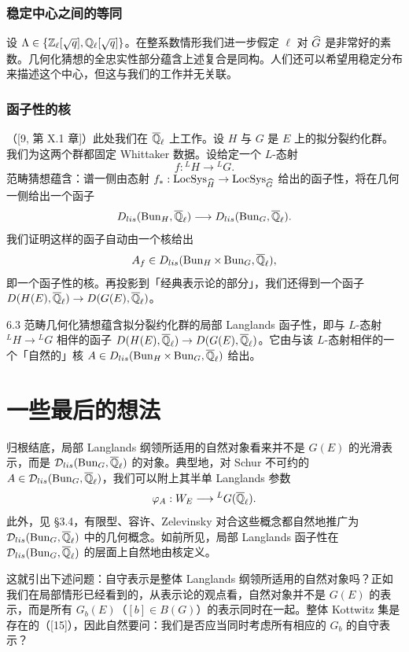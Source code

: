 \subsubsection{稳定中心之间的等同}
设 $\Lambda\in\{\mathbb{Z}_\ell[\sqrt q],\mathbb{Q}_\ell[\sqrt q]\}$。在整系数情形我们进一步假定 $\ell$ 对 $\widehat{G}$ 是非常好的素数。几何化猜想的全忠实性部分蕴含上述复合是同构。人们还可以希望用稳定分布来描述这个中心，但这与我们的工作并无关联。

\subsubsection{函子性的核}
（[9, 第 X.1 章]）此处我们在 $\overline{\mathbb{Q}}_\ell$ 上工作。设 $H$ 与 $G$ 是 $E$ 上的拟分裂约化群。我们为这两个群都固定 Whittaker 数据。设给定一个 $L$-态射
\[
f:{}^LH\longrightarrow{}^LG.
\]
范畴猜想蕴含：谱一侧由态射 $f_*:\operatorname{LocSys}_{\widehat{H}}\to\operatorname{LocSys}_{\widehat{G}}$ 给出的函子性，将在几何一侧给出一个函子
\[
D_{lis}(\operatorname{Bun}_H,\overline{\mathbb{Q}}_\ell)\longrightarrow D_{lis}(\operatorname{Bun}_G,\overline{\mathbb{Q}}_\ell).
\]
我们证明这样的函子自动由一个核给出
\[
A_f\in D_{lis}(\operatorname{Bun}_H\times\operatorname{Bun}_G,\overline{\mathbb{Q}}_\ell),
\]
即一个函子性的核。再投影到「经典表示论的部分」，我们还得到一个函子 $D(H(E),\overline{\mathbb{Q}}_\ell)\to D(G(E),\overline{\mathbb{Q}}_\ell)$。

\begin{thm}{6.3}\label{thm:a3-6-3}
范畴几何化猜想蕴含拟分裂约化群的局部 Langlands 函子性，即与 $L$-态射 ${}^LH\to{}^LG$ 相伴的函子 $D(H(E),\overline{\mathbb{Q}}_\ell)\to D(G(E),\overline{\mathbb{Q}}_\ell)$。它由与该 $L$-态射相伴的一个「自然的」核 $A\in D_{lis}(\operatorname{Bun}_H\times\operatorname{Bun}_G,\overline{\mathbb{Q}}_\ell)$ 给出。
\end{thm}

\section{一些最后的想法}
归根结底，局部 Langlands 纲领所适用的自然对象看来并不是 $G(E)$ 的光滑表示，而是 $\mathcal{D}_{lis}(\operatorname{Bun}_G,\overline{\mathbb{Q}}_\ell)$ 的对象。典型地，对 Schur 不可约的 $A\in\mathcal{D}_{lis}(\operatorname{Bun}_G,\overline{\mathbb{Q}}_\ell)$，我们可以附上其半单 Langlands 参数
\[
\varphi_A:W_E\longrightarrow{}^LG(\overline{\mathbb{Q}}_\ell).
\]
此外，见 §3.4，有限型、容许、Zelevinsky 对合这些概念都自然地推广为 $\mathcal{D}_{lis}(\operatorname{Bun}_G,\overline{\mathbb{Q}}_\ell)$ 中的几何概念。如前所见，局部 Langlands 函子性在 $\mathcal{D}_{lis}(\operatorname{Bun}_G,\overline{\mathbb{Q}}_\ell)$ 的层面上自然地由核定义。

这就引出下述问题：自守表示是整体 Langlands 纲领所适用的自然对象吗？正如我们在局部情形已经看到的，从表示论的观点看，自然对象并不是 $G(E)$ 的表示，而是所有 $G_b(E)$（$[b]\in B(G)$）的表示同时在一起。整体 Kottwitz 集是存在的（[15]），因此自然要问：我们是否应当同时考虑所有相应的 $G_b$ 的自守表示？

